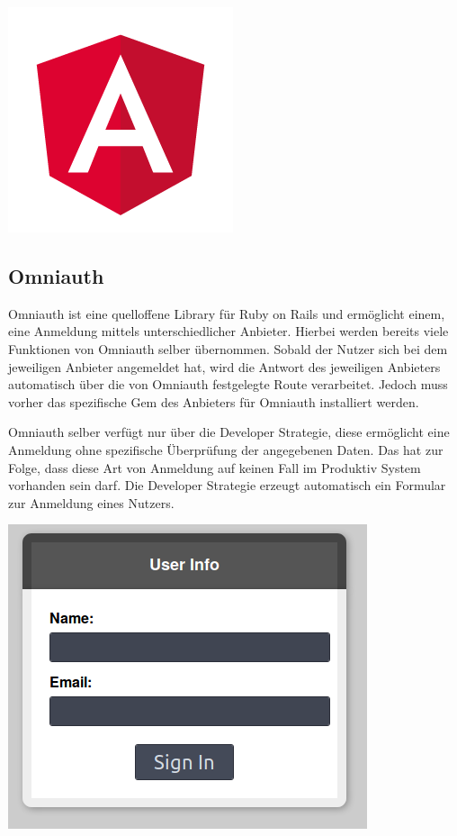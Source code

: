 \documentclass[11pt]{article}
\begin{document}
\begin{flushleft}
			\begin{center}
				\includegraphics[scale=0.1]{angular.png}
			\end{center}
			
			\subsection{Omniauth}
			\label{sec: omniauth}
			Omniauth ist eine quelloffene Library für Ruby on Rails und ermöglicht einem, eine Anmeldung mittels unterschiedlicher Anbieter. Hierbei werden bereits viele Funktionen von Omniauth selber übernommen. Sobald der Nutzer sich bei dem jeweiligen Anbieter angemeldet hat, wird die Antwort des jeweiligen Anbieters automatisch über die von Omniauth festgelegte Route verarbeitet. Jedoch muss vorher das spezifische Gem des Anbieters für Omniauth installiert werden.\par\bigskip
			
			Omniauth selber verfügt nur über die Developer Strategie, diese ermöglicht eine Anmeldung ohne spezifische Überprüfung der angegebenen Daten. Das hat zur Folge, dass diese Art von Anmeldung auf keinen Fall im Produktiv System vorhanden sein darf. Die Developer Strategie erzeugt automatisch ein Formular zur Anmeldung eines Nutzers.
			
			\begin{center}
				\includegraphics[scale=0.5]{developer_strategy.png}
			\end{center}
		

\end{flushleft}
\end{document}
